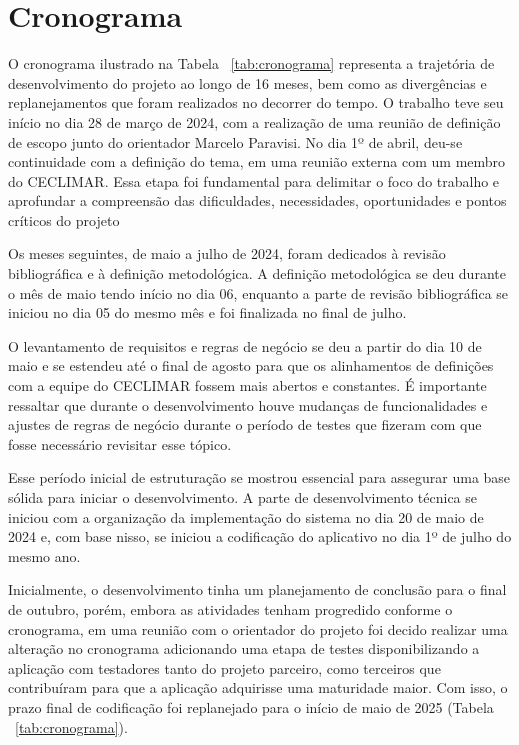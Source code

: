 \chapter{Cronograma}\label{cronograma}

O cronograma ilustrado na Tabela ~\ref{tab:cronograma} representa a trajetória de 
desenvolvimento do projeto ao longo de 16 meses, bem como as divergências e 
replanejamentos que foram realizados no decorrer do tempo. O trabalho teve seu 
início no dia 28 de março de 2024, com a realização de uma reunião de definição 
de escopo junto do orientador Marcelo Paravisi. No dia 1º de abril, deu-se 
continuidade com a definição do tema, em uma reunião externa com um membro do 
CECLIMAR. Essa etapa foi fundamental para delimitar o foco do trabalho e aprofundar 
a compreensão das dificuldades, necessidades, oportunidades e pontos críticos do projeto

Os meses seguintes, de maio a julho de 2024, foram dedicados à revisão bibliográfica 
e à definição metodológica. A definição metodológica se deu durante o mês de maio 
tendo início no dia 06, enquanto a parte de revisão bibliográfica se iniciou no 
dia 05 do mesmo mês e foi finalizada no final de julho. 

O levantamento de requisitos e regras de negócio se deu a partir do dia 10 de 
maio e se estendeu até o final de agosto para que os alinhamentos de definições 
com a equipe do CECLIMAR fossem mais abertos e constantes. É importante ressaltar 
que durante o desenvolvimento houve mudanças de funcionalidades e ajustes de regras 
de negócio durante o período de testes que fizeram com que fosse necessário 
revisitar esse tópico. 

Esse período inicial de estruturação se mostrou essencial para assegurar uma base 
sólida para iniciar o desenvolvimento. A parte de desenvolvimento técnica se 
iniciou com a organização da implementação do sistema no dia 20 de maio de 2024 
e, com base nisso, se iniciou a codificação do aplicativo no dia 1º de julho do mesmo ano. 

Inicialmente, o desenvolvimento tinha um planejamento de conclusão para o final 
de outubro, porém, embora as atividades tenham progredido conforme o cronograma, 
em uma reunião com o orientador do projeto foi decido realizar uma alteração no 
cronograma adicionando uma etapa de testes disponibilizando a aplicação com 
testadores tanto do projeto parceiro, como terceiros que contribuíram para que 
a aplicação adquirisse uma maturidade maior. Com isso, o prazo final de codificação 
foi replanejado para o início de maio de 2025 (Tabela ~\ref{tab:cronograma}).

